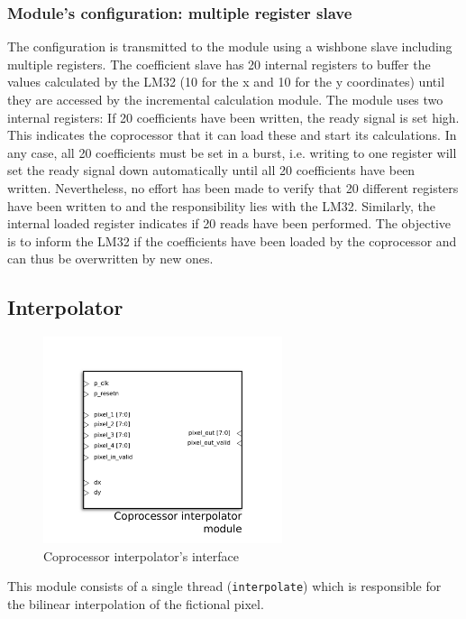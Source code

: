 \subsubsection{Module's configuration: multiple register slave}



The configuration is transmitted to the module using a wishbone slave including multiple registers.
The coefficient slave has 20 internal registers to buffer the values calculated by the LM32 (10 for the x and 10 for the y coordinates) until they are accessed by the incremental calculation module. The module uses two internal registers: If 20 coefficients have been written, the ready signal is set high. This indicates the coprocessor that it can load these and start its calculations. In any case, all 20 coefficients must be set in a burst, i.e. writing to one register will set the ready signal down automatically until all 20 coefficients have been written. Nevertheless, no effort has been made to verify that 20 different registers have been written to and the responsibility lies with the LM32. Similarly, the internal loaded register indicates if 20 reads have been performed. The objective is to inform the LM32 if the coefficients have been loaded by the coprocessor and can thus be overwritten by new ones.

\subsection{Interpolator}

\begin{figure}[H]
\center
\includegraphics[width=7cm]{figs/INTERPOLATOR.pdf}
\caption{Coprocessor interpolator's interface}
\label{interpo_ports}
\end{figure}



This module consists of a single thread (\texttt{interpolate}) which is responsible for the bilinear interpolation of the fictional pixel. 

